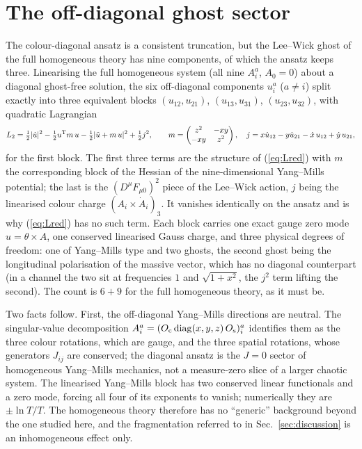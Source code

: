 
\section{The off-diagonal ghost sector}
\label{sec:offdiag}

The colour-diagonal ansatz is a consistent truncation, but the Lee--Wick ghost of the full
homogeneous theory has nine components, of which the ansatz keeps three. Linearising the full
homogeneous system (all nine $A^a_i$, $A_0=0$) about a diagonal ghost-free solution, the six
off-diagonal components $u^a_i$ ($a\ne i$) split exactly into three equivalent blocks
$(u_{12},u_{21})$, $(u_{13},u_{31})$, $(u_{23},u_{32})$, with quadratic Lagrangian
\begin{equation}
L_2=\tfrac12|\dot u|^2-\tfrac12u^{\rm T}m\,u-\tfrac12|\ddot u+m\,u|^2+\tfrac12j^2,\qquad
m=\begin{pmatrix}z^2&-xy\\-xy&z^2\end{pmatrix},\quad
j=x\dot u_{12}-y\dot u_{21}-\dot x\,u_{12}+\dot y\,u_{21},
\label{eq:L2}
\end{equation}
for the first block. The first three terms are the structure of (\ref{eq:Lred}) with $m$ the
corresponding block of the Hessian of the nine-dimensional Yang--Mills potential; the last is
the $(D^\mu F_{\mu0})^2$ piece of the Lee--Wick action, $j$ being the linearised colour charge
$(A_i\times\dot A_i)_3$. It vanishes identically on the ansatz and is why (\ref{eq:Lred}) has no
such term. Each block carries one exact gauge zero mode $u=\theta\times A$, one conserved
linearised Gauss charge, and three physical degrees of freedom: one of Yang--Mills type and two
ghosts, the second ghost being the longitudinal polarisation of the massive vector, which has no
diagonal counterpart (in a channel the two sit at frequencies $1$ and $\sqrt{1+x^2}$, the $j^2$
term lifting the second). The count is $6+9$ for the full homogeneous theory, as it must be.

Two facts follow. First, the off-diagonal Yang--Mills directions are neutral. The singular-value
decomposition $A^a_i=(O_{\rm c}\,{\rm diag}(x,y,z)\,O_{\rm s})^a_i$ identifies them as the three
colour rotations, which are gauge, and the three spatial rotations, whose generators $J_{ij}$ are
conserved; the diagonal ansatz is the $J=0$ sector of homogeneous Yang--Mills mechanics, not a
measure-zero slice of a larger chaotic system. The linearised Yang--Mills block has two conserved
linear functionals and a zero mode, forcing all four of its exponents to vanish; numerically they
are $\pm\ln T/T$. The homogeneous theory therefore has no ``generic'' background beyond the one
studied here, and the fragmentation referred to in Sec.~\ref{sec:discussion} is an inhomogeneous
effect only.

